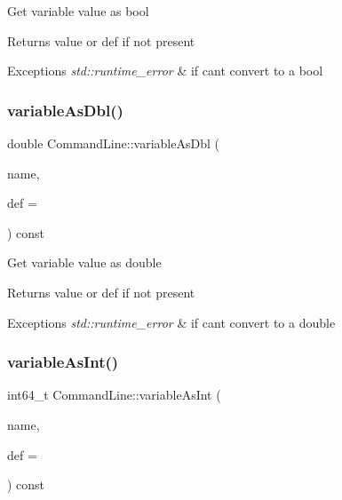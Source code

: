 Get variable value as bool \begin{DoxyReturn}{Returns}
value or def if not present 
\end{DoxyReturn}

\begin{DoxyExceptions}{Exceptions}
{\em std\+::runtime\+\_\+error} & if can\textquotesingle{}t convert to a bool \\
\hline
\end{DoxyExceptions}
\mbox{\label{classtheoria_1_1util_1_1CommandLine_a42fbe66f3bcf121ad631df39d09606ef}} 
\subsubsection{\texorpdfstring{variable\+As\+Dbl()}{variableAsDbl()}}
{\footnotesize\ttfamily double Command\+Line\+::variable\+As\+Dbl (\begin{DoxyParamCaption}\item[{const std\+::string \&}]{name,  }\item[{double}]{def = {} }\end{DoxyParamCaption}) const}

Get variable value as double \begin{DoxyReturn}{Returns}
value or def if not present 
\end{DoxyReturn}

\begin{DoxyExceptions}{Exceptions}
{\em std\+::runtime\+\_\+error} & if can\textquotesingle{}t convert to a double \\
\hline
\end{DoxyExceptions}
\mbox{\label{classtheoria_1_1util_1_1CommandLine_a182748d9cfb606cbf45ee7dc7e016a52}} 
\subsubsection{\texorpdfstring{variable\+As\+Int()}{variableAsInt()}}
{\footnotesize\ttfamily int64\+\_\+t Command\+Line\+::variable\+As\+Int (\begin{DoxyParamCaption}\item[{const std\+::string \&}]{name,  }\item[{int64\+\_\+t}]{def = {} }\end{DoxyParamCaption}) const}

